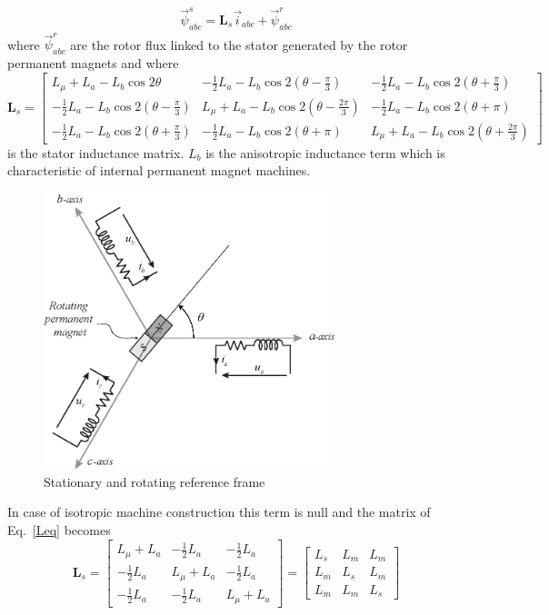 \documentclass[11pt,a4paper,oneside]{book}
\numberwithin{equation}{section}
\theoremstyle{it}
\theoremstyle{definition}
\begin{document}
\begin{equation}\label{threephase_eq2}
	\begin{aligned}
		\vec{\psi}^s_{abc} = \mathbf{L}_s\vec{i}_{abc}+\vec{\psi}^r_{abc}
	\end{aligned}
\end{equation}
where $\vec{\psi}^r_{abc}$ are the rotor flux linked to the stator generated by 
the rotor permanent magnets and where
\begin{equation}\label{Leq}
	\mathbf{L}_s = 
	\begin{bmatrix} 
		L_{\mu}+L_a-L_b\cos2\theta & 
		-\frac{1}{2}L_a-L_b\cos2(\theta-\frac{\pi}{3}) & 
		-\frac{1}{2}L_a-L_b\cos2(\theta+\frac{\pi}{3}) \\[6pt]
		-\frac{1}{2}L_a-L_b\cos2(\theta-\frac{\pi}{3}) & 
		L_{\mu}+L_a-L_b\cos2(\theta-\frac{2\pi}{3}) & 
		-\frac{1}{2}L_a-L_b\cos2(\theta+\pi) \\[6pt]
		-\frac{1}{2}L_a-L_b\cos2(\theta+\frac{\pi}{3}) & 
		-\frac{1}{2}L_a-L_b\cos2(\theta+\pi) & 
		L_{\mu}+L_a-L_b\cos2(\theta+\frac{2\pi}{3})
	\end{bmatrix}
\end{equation}
is the stator inductance matrix. $L_b$ is the anisotropic inductance term which 
is characteristic of internal permanent magnet machines. 
\begin{figure}[H]
	\centering
	\includegraphics[width = 240pt, 
	keepaspectratio]{figures/pmsm/electrical_three_phases.eps}
	\captionsetup{width=0.5\textwidth, font=small} 
	\caption	{Stationary and rotating reference frame}
	\label{electrical_three_phase}
\end{figure}
In case of isotropic machine construction this term is null and the matrix of 
Eq.~\ref{Leq} becomes
\begin{equation}
	\mathbf{L}_s = 
	\begin{bmatrix} 
		L_{\mu}+L_a & -\frac{1}{2}L_a & -\frac{1}{2}L_a \\[6pt]
		-\frac{1}{2}L_a & L_{\mu}+L_a & -\frac{1}{2}L_a \\[6pt]
		-\frac{1}{2}L_a & -\frac{1}{2}L_a & L_{\mu}+L_a
	\end{bmatrix} =
	\begin{bmatrix} 
		L_s & L_m & L_m \\[6pt]
		L_m & L_s & L_m \\[6pt]
		L_m & L_m & L_s
	\end{bmatrix}
\end{equation}
\end{document}
